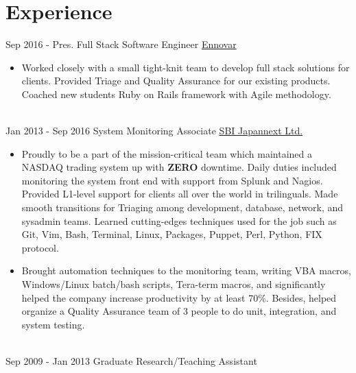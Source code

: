 \documentclass[letterpaper]{twentysecondcv} %
\begin{document}
\makeprofile %


\section{Experience}

\begin{twenty} %
\twentyitem
    	{Sep 2016 -}
		{Pres.}
        {Full Stack Software Engineer}
        {\href{http://ennovar.io/}{Ennovar}}
        {}
        {
        {\begin{itemize}
        \item Worked closely with a small tight-knit team to develop full stack solutions for clients. Provided Triage and Quality Assurance for our existing products. Coached new students Ruby on Rails framework with Agile methodology.
        \end{itemize}}
        }
        \\
	\twentyitem
    	{Jan 2013 -}
		{Sep 2016}
        {System Monitoring Associate}
        {\href{http://en.japannext.co.jp/}{SBI Japannext Ltd.}}
        {}
        {
        {\begin{itemize}
                \item Proudly to be a part of the mission-critical team which maintained a NASDAQ trading system up with \textbf{ZERO} downtime. Daily duties included monitoring the system front end with support from Splunk and Nagios. Provided L1-level support for clients all over the world in trilinguals. Made smooth transitions for Triaging among development, database, network, and sysadmin teams. Learned cutting-edges techniques used for the job such as Git, Vim, Bash, Terminal, Linux, Packages, Puppet, Perl, Python, FIX protocol.
                \item Brought automation techniques to the monitoring team, writing VBA macros, Windows/Linux batch/bash scripts, Tera-term macros, and significantly helped the company increase productivity by at least 70\%. Besides, helped organize a Quality Assurance team of 3 people to do unit, integration, and system testing.
         \end{itemize}}
        }
    \\
    \twentyitem
   		{Sep 2009 -}
		{Jan 2013}
        {Graduate Research/Teaching Assistant}

\end{twenty}
\end{document}

